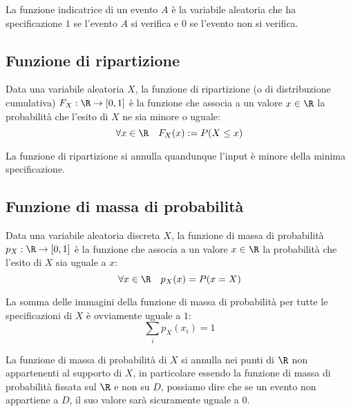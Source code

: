 \begin{defin} \label{def:findiceven}
	La funzione indicatrice di un evento $A$ è la variabile aleatoria che ha specificazione $1$ se l'evento $A$ si verifica e $0$ se l'evento non si verifica.
\end{defin}



\subsection{Funzione di ripartizione}
\begin{defin} \label{def:fripar}
	Data una variabile aleatoria $X$, la funzione di ripartizione (o di distribuzione cumulativa) $F_X:\R\to[0,1]$ è la funzione che associa a un valore $x\in\R$ la probabilità che l'esito di $X$ ne sia minore o uguale:
	\begin{equation*}
		\forall x\in\R\quad F_X(x):=P(X\leq x)
	\end{equation*}
\end{defin}

La funzione di ripartizione si annulla quandunque l'input è minore della minima specificazione.




\subsection{Funzione di massa di probabilità}
\begin{defin} \label{def:fmassaprob}
	Data una variabile aleatoria discreta $X$, la funzione di massa di probabilità $p_X:\R\to[0,1]$ è la funzione che associa a un valore $x\in\R$ la probabilità che l'esito di $X$ sia uguale a $x$:
	\begin{equation*}
		\forall x \in\R\quad p_X(x)= P(x=X)
	\end{equation*}
\end{defin}

La somma delle immagini della funzione di massa di probabilità per tutte le specificazioni di $X$ è ovviamente uguale a $1$:
\begin{equation} \label{eq:sommamassa}
	\sum_i p_X (x_i) = 1
\end{equation}

La funzione di massa di probabilità di $X$ si annulla nei punti di $\R$ non appartenenti al supporto di $X$, in particolare essendo la funzione di massa di probabilità fissata sul $\R$ e non su $D$, possiamo dire che se un evento non appartiene a $D$, il suo valore sarà sicuramente uguale a 0.

